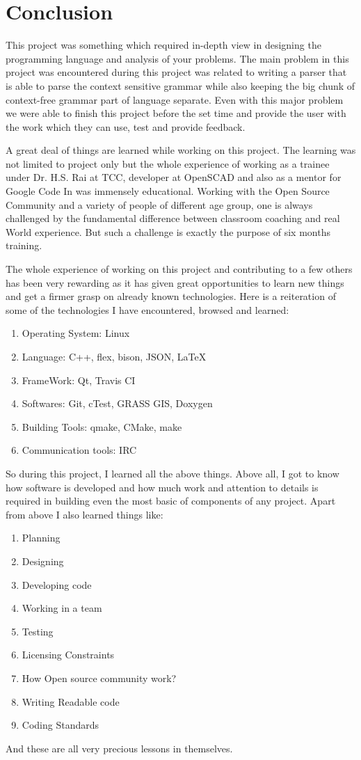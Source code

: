 \section{Conclusion}

This project was something which required in-depth view in designing the programming language and analysis of your problems.
The main problem in this project was encountered during this project was related to writing a parser that is able to parse the context sensitive grammar while also keeping the big chunk of context-free grammar part of language separate.
Even with this major problem we were able to finish this project before the set time and provide the user with the work which they can use, test and provide feedback.

A great deal of things are learned while working on this project. The learning was not limited to project only but
the whole experience of working as a trainee under Dr. H.S. Rai at TCC, developer at OpenSCAD and also as a mentor for Google Code In was immensely educational. Working with the Open Source Community and a variety of people of different age group, one is always challenged by the fundamental difference between classroom coaching and real World experience. But such a challenge is exactly the purpose of six months training.

The whole experience of working on this project and contributing to a few others has been very
rewarding as it has given great opportunities to learn new things and get a firmer grasp on already
known technologies. Here is a reiteration of some of the technologies I have encountered, browsed and learned:
\begin{enumerate}
    \item Operating System: Linux
    \item Language: C++, flex, bison, JSON, \LaTeX
    \item FrameWork: Qt, Travis CI
    \item Softwares: Git, cTest, GRASS GIS, Doxygen
    \item Building Tools: qmake, CMake, make
    \item Communication tools: IRC
\end{enumerate}
So during this project, I learned all the above things. Above all, I got to know how software is
developed and how much work and attention to details is required in building even the most basic
of components of any project. Apart from above I also learned things like:
\begin{enumerate}
    \item Planning
    \item Designing
    \item Developing code
    \item Working in a team
    \item Testing
    \item Licensing Constraints
    \item How Open source community work?
    \item Writing Readable code
    \item Coding Standards
\end{enumerate}
And these are all very precious lessons in themselves.